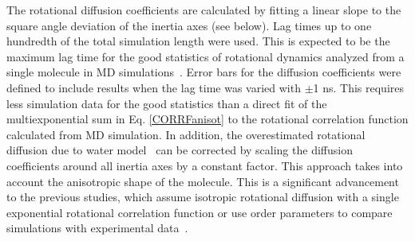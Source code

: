 \documentclass[journal=jpcbfk,manuscript=article]{achemso}
\begin{document}
The rotational diffusion coefficients are calculated by fitting a linear slope to the 
square angle deviation of the inertia axes (see below).
Lag times up to one hundredth of the total simulation length were used.
This is expected to be the maximum lag time for the good statistics
of rotational dynamics analyzed from a single molecule in MD simulations~\cite{lu06}.
Error bars for the diffusion coefficients were defined to include results when the lag
time was varied with $\pm$1 ns.
This requires less simulation data
for the good statistics than a direct fit of the multiexponential sum in Eq. \ref{CORRFanisot}
to the rotational correlation function calculated from MD simulation.
In addition, the overestimated rotational diffusion due to water model~\cite{wong08,takemura12,debiec16} can
be corrected by scaling the diffusion coefficients around all inertia axes
by a constant factor. This approach takes into account the anisotropic shape of
the molecule. This is a significant advancement to the previous studies, which assume
isotropic rotational diffusion with a single exponential rotational correlation
function \cite{showalter07a,showalter07b,maragakis08,gu14,allner15} or
use order parameters to compare simulations with experimental data~\cite{gu14,maragakis08,trbovic08,best04}.
\end{document}
